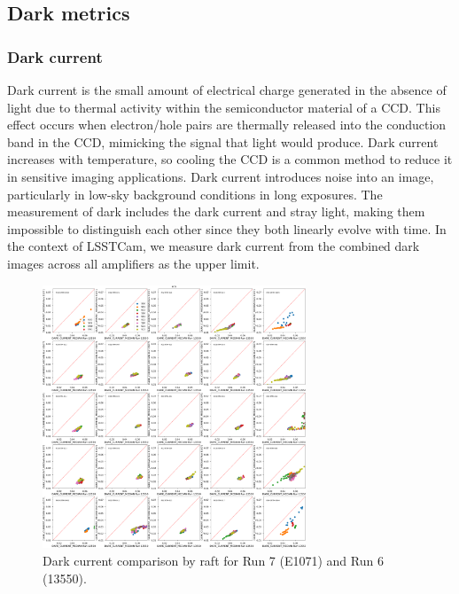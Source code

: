 \subsection{Dark metrics}\label{dark-metrics}

\subsubsection{Dark current}\label{dark-current}

Dark current is the small amount of electrical charge generated in the
absence of light due to thermal activity within the semiconductor
material of a CCD. This effect occurs when electron/hole pairs are thermally released
into the conduction band in the CCD, mimicking the signal that light would
produce. Dark current increases with temperature, so cooling the CCD is
a common method to reduce it in sensitive imaging applications. Dark
current introduces noise into an image, particularly in low-sky background conditions in long exposures.
The measurement of dark includes the dark current and stray light, making them impossible to distinguish each other since they both linearly evolve with time.
In the context
of LSSTCam, we measure dark current from the combined dark images across
all amplifiers as the upper limit.

\begin{figure}[ht]
\begin{centering}
\includegraphics[width=0.7\textwidth]{figures/baselineCharacterization/13550_E1071_DARK_CURRENT_MEDIAN_inset.png}
\caption{Dark current comparison by raft for Run 7 (E1071) and Run 6 (13550).}
\label{fig:dark}
\end{centering}
\end{figure}

